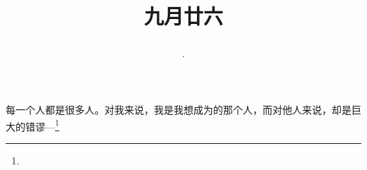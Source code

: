 \title{\date[d=28,m=10,y=2024][year:cn-y,年,month:cn,day:cn,日,·,weekday]·九月廿六 }
每一个人都是很多人。对我来说，我是我想成为的那个人，而对他人来说，却是巨大的错谬—\footnote{ }

